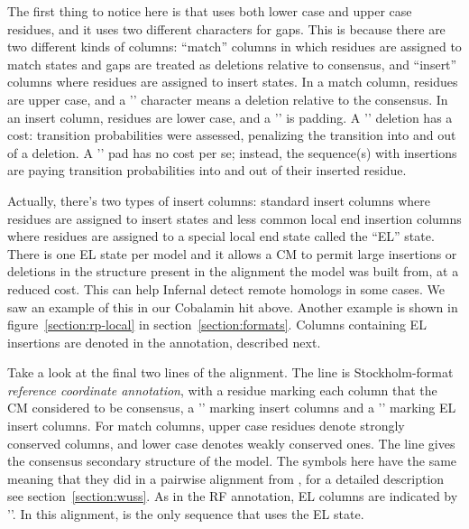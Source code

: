 The first thing to notice here is that  uses both lower
case and upper case residues, and it uses two different characters for
gaps. This is because there are two different kinds of columns:
``match'' columns in which residues are assigned to match states and
gaps are treated as deletions relative to consensus, and ``insert''
columns where residues are assigned to insert states.
In a match column, residues are upper case, and a '\otext{-}'
character means a deletion relative to the consensus. In an insert
column, residues are lower case, and a '' is padding.  A '\otext{-}' deletion
has a cost: transition probabilities were assessed, penalizing the
transition into and out of a deletion. A '' pad has no cost per se;
instead, the sequence(s) with insertions are paying transition
probabilities into and out of their inserted residue.

Actually, there's two types of insert columns: standard insert columns
where residues are assigned to insert states and less common local end
insertion columns where residues are assigned to a special local end
state called the ``EL'' state. There is one EL state per model and it
allows a CM to permit large insertions or deletions in the structure
present in the alignment the model was built from, at a reduced
cost. This can help Infernal detect remote homologs in some cases. We
saw an example of this in our Cobalamin  hit
above. Another example is shown in figure~\ref{section:rp-local} in
section~\ref{section:formats}. Columns containing EL insertions are
denoted in the  annotation, described next.

Take a look at the final two lines of the alignment. The  line is Stockholm-format \emph{reference coordinate annotation},
with a residue marking each column that the CM considered to be
consensus, a '' marking insert columns and a '\otext{~}'
marking EL insert columns. For match columns, upper case residues
denote strongly conserved columns, and lower case denotes weakly
conserved ones. The  line gives the consensus
secondary structure of the model. The symbols here have the same
meaning that they did in a pairwise alignment from ,
for a detailed description see section~\ref{section:wuss}. As in the
RF annotation, EL columns are indicated by '\otext{~}'. In this
alignment,  is the only sequence that uses the EL
state.

